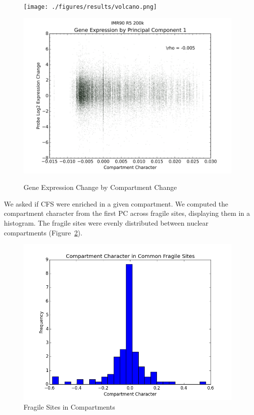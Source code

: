 \begin{figure}[H]
  \caption{Gene Expression Change by Compartment Change}
  \begin{minipage}[b]{0.45\textwidth}\label{fig:expressionChangeByCompartmentChange}
    \texttt{[image: ./figures/results/volcano.png]}
  \end{minipage}%
  \hfill
  \begin{minipage}[b]{0.45\textwidth}\label{fig:expressionChangeByCompartment}
    \includegraphics[width=\textwidth]{./figures/results/compartment_ir5_200k.png}
  \end{minipage}
\end{figure}

We asked if \gls{CFS} were enriched in a given compartment.  We computed the compartment character from the first \gls{PC} across fragile
sites, displaying them in a histogram.  The fragile sites were evenly distributed between nuclear compartments (Figure~\ref{fig:compartmentCFS}).

\begin{figure}[H]
  \centering
  \caption{Fragile Sites in Compartments}\label{fig:compartmentCFS}
  \includegraphics[width=\textwidth]{./figures/results/cfs.png}
\end{figure}

